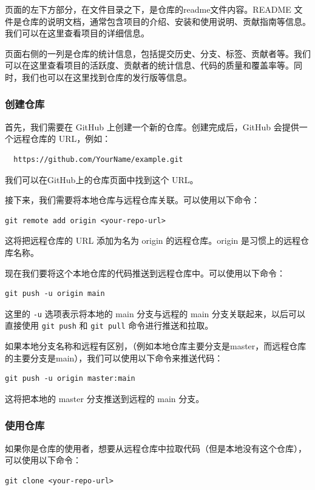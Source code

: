 \documentclass[fontset=none]{ctexart}
\begin{document}
页面的左下方部分，在文件目录之下，是仓库的readme文件内容。README 文件是仓库的说明文档，通常包含项目的介绍、安装和使用说明、贡献指南等信息。我们可以在这里查看项目的详细信息。

页面右侧的一列是仓库的统计信息，包括提交历史、分支、标签、贡献者等。我们可以在这里查看项目的活跃度、贡献者的统计信息、代码的质量和覆盖率等。同时，我们也可以在这里找到仓库的发行版等信息。

\subsubsection{创建仓库}
首先，我们需要在 GitHub 上创建一个新的仓库。创建完成后，GitHub 会提供一个远程仓库的 URL，例如：
\begin{verbatim}
  https://github.com/YourName/example.git
\end{verbatim}
我们可以在GitHub上的仓库页面中找到这个 URL。

接下来，我们需要将本地仓库与远程仓库关联。可以使用以下命令：
\begin{verbatim}
git remote add origin <your-repo-url>
\end{verbatim}
这将把远程仓库的 URL 添加为名为 origin 的远程仓库。origin 是习惯上的远程仓库名称。

现在我们要将这个本地仓库的代码推送到远程仓库中。可以使用以下命令：
\begin{verbatim}
git push -u origin main
\end{verbatim}
这里的  \texttt{-u}  选项表示将本地的 main 分支与远程的 main 分支关联起来，以后可以直接使用  \texttt{git push}  和  \texttt{git pull}  命令进行推送和拉取。

如果本地分支名称和远程有区别，（例如本地仓库主要分支是master，而远程仓库的主要分支是main），我们可以使用以下命令来推送代码：
\begin{verbatim}
git push -u origin master:main
\end{verbatim}
这将把本地的 master 分支推送到远程的 main 分支。

\subsubsection{使用仓库}

如果你是仓库的使用者，想要从远程仓库中拉取代码（但是本地没有这个仓库），可以使用以下命令：

\begin{verbatim}
git clone <your-repo-url>
\end{verbatim}
\end{document}
